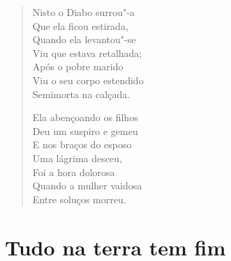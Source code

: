 \begin{verse}
Nisto o Diabo surrou"-a \\
Que ela ficou estirada, \\
Quando ela levantou"-se \\
Viu que estava retalhada; \\
Após o pobre marido \\
Viu o seu corpo estendido \\
Semimorta na calçada. 


Ela abençoando os filhos \\
Deu um suspiro e gemeu \\
E nos braços do esposo \\
Uma lágrima desceu, \\
Foi a hora dolorosa \\
Quando a mulher vaidosa \\
Entre soluços morreu. 
\end{verse}

\chapter{Tudo na terra tem fim}

